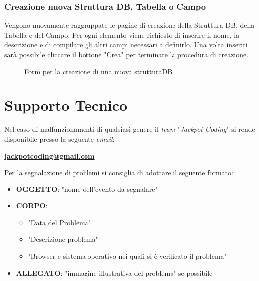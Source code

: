 \documentclass[5pt]{article}
\begin{document}
	    \subsubsection{Creazione nuova Struttura DB, Tabella o Campo}
	    Vengono nuovamente raggruppate le pagine di creazione della Struttura DB, della Tabella e del Campo. Per ogni elemento viene richiesto di inserire il nome, la descrizione e di compilare gli altri campi necessari a definirlo. Una volta inseriti sarà possibile cliccare il bottone "Crea" per terminare la procedura di creazione.
	    \begin{figure}[ht]
	    	\centering
	    	\caption{Form per la creazione di una nuova strutturaDB}
	    \end{figure}
	    
        
	\section{Supporto Tecnico}
		Nel caso di malfunzionamenti di qualsiasi genere il \textit{team} "\textit{Jackpot Coding}" si rende disponibile presso la seguente \textit{email}:
		\begin{center}
			\textbf{\url{jackpotcoding@gmail.com}}
		\end{center}

		Per la segnalazione di problemi si consiglia di adottare il seguente formato:
		\begin{itemize}
			\item \textbf{OGGETTO}: "nome dell'evento da segnalare"
			\item \textbf{CORPO}:
			\begin{itemize}
				\item "Data del Problema"
				\item "Descrizione problema"
				\item "Browser e sistema operativo nei quali si è verificato il problema"
			\end{itemize}
			\item \textbf{ALLEGATO}: "immagine illustrativa del problema" se possibile
		\end{itemize}
        
\end{document}
